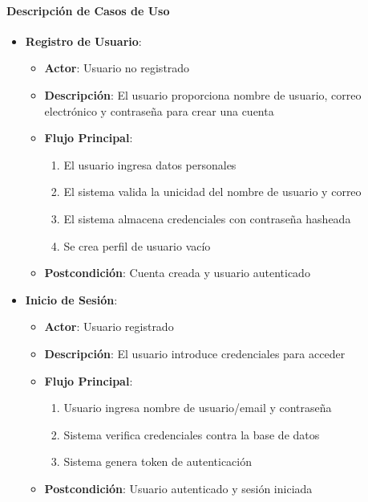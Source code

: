 \documentclass[12pt,letterpaper]{article}
\begin{document}
\paragraph{Descripción de Casos de Uso}
\begin{itemize}
    \item \textbf{Registro de Usuario}:
    \begin{itemize}
        \item \textbf{Actor}: Usuario no registrado
        \item \textbf{Descripción}: El usuario proporciona nombre de usuario, correo electrónico y contraseña para crear una cuenta
        \item \textbf{Flujo Principal}:
        \begin{enumerate}
            \item El usuario ingresa datos personales
            \item El sistema valida la unicidad del nombre de usuario y correo
            \item El sistema almacena credenciales con contraseña hasheada
            \item Se crea perfil de usuario vacío
        \end{enumerate}
        \item \textbf{Postcondición}: Cuenta creada y usuario autenticado
    \end{itemize}
    
    \item \textbf{Inicio de Sesión}:
    \begin{itemize}
        \item \textbf{Actor}: Usuario registrado
        \item \textbf{Descripción}: El usuario introduce credenciales para acceder
        \item \textbf{Flujo Principal}:
        \begin{enumerate}
            \item Usuario ingresa nombre de usuario/email y contraseña
            \item Sistema verifica credenciales contra la base de datos
            \item Sistema genera token de autenticación
        \end{enumerate}
        \item \textbf{Postcondición}: Usuario autenticado y sesión iniciada
    \end{itemize}
    

\end{itemize}
\end{document}
